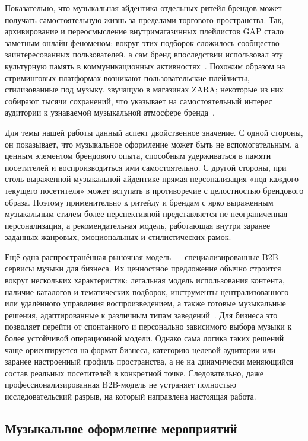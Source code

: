 Показательно, что музыкальная айдентика отдельных ритейл-брендов может получать самостоятельную жизнь за пределами торгового пространства. Так, архивирование и переосмысление внутримагазинных плейлистов GAP стало заметным онлайн-феноменом: вокруг этих подборок сложилось сообщество заинтересованных пользователей, а сам бренд впоследствии использовал эту культурную память в коммуникационных активностях~\cite{vogue_gap_playlists_2022}. Похожим образом на стриминговых платформах возникают пользовательские плейлисты, стилизованные под музыку, звучащую в магазинах ZARA; некоторые из них собирают тысячи сохранений, что указывает на самостоятельный интерес аудитории к узнаваемой музыкальной атмосфере бренда~\cite{spotify_zara_store_playlist_2026}.

Для темы нашей работы данный аспект двойственное значение. С одной стороны, он показывает, что музыкальное оформление может быть не вспомогательным, а ценным элементом брендового опыта, способным удерживаться в памяти посетителей и воспроизводиться ими самостоятельно. С другой стороны, при столь выраженной музыкальной айдентике прямая персонализация «под каждого текущего посетителя» может вступать в противоречие с целостностью брендового образа. Поэтому применительно к ритейлу и брендам с ярко выраженным музыкальным стилем более перспективной представляется не неограниченная персонализация, а рекомендательная модель, работающая внутри заранее заданных жанровых, эмоциональных и стилистических рамок.

Ещё одна распространённая рыночная модель — специализированные B2B-сервисы музыки для бизнеса. Их ценностное предложение обычно строится вокруг нескольких характеристик: легальная модель использования контента, наличие каталогов и тематических подборок, инструменты централизованного или удалённого управления воспроизведением, а также готовые музыкальные решения, адаптированные к различным типам заведений~\cite{zvuk_business_site}. Для бизнеса это позволяет перейти от спонтанного и персонально зависимого выбора музыки к более устойчивой операционной модели. Однако сама логика таких решений чаще ориентируется на формат бизнеса, категорию целевой аудитории или заранее настроенный профиль пространства, а не на динамически меняющийся состав реальных посетителей в конкретной точке. Следовательно, даже профессионализированная B2B-модель не устраняет полностью исследовательский разрыв, на который направлена настоящая работа.

\subsection{Музыкальное оформление мероприятий}

